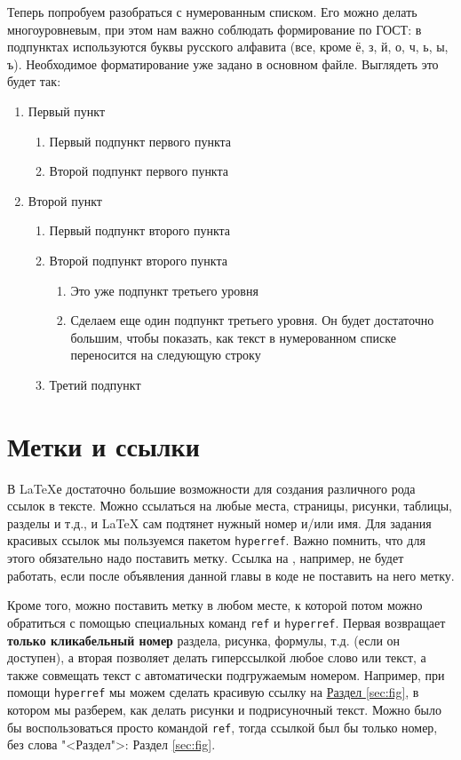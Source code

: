     Теперь попробуем разобраться с нумерованным списком. Его можно делать многоуровневым, при этом нам важно соблюдать формирование по ГОСТ: в подпунктах используются буквы русского алфавита (все, кроме ё, з, й, о, ч, ь, ы, ъ). Необходимое форматирование уже задано в основном файле. Выглядеть это будет так:

    \begin{enumerate}
        \item Первый пункт
        \begin{enumerate}
            \item Первый подпункт первого пункта
            \item Второй подпункт первого пункта
        \end{enumerate}
        \item Второй пункт
        \begin{enumerate}
            \item Первый подпункт второго пункта
            \item Второй подпункт второго пункта
            \begin{enumerate}
                \item Это уже подпункт третьего уровня
                \item Сделаем еще один подпункт третьего уровня. Он будет достаточно большим, чтобы показать, как текст в нумерованном списке переносится на следующую строку
            \end{enumerate}
            \item Третий подпункт
        \end{enumerate}
    \end{enumerate}

\section{Метки и ссылки}

В \LaTeX{}е достаточно большие возможности для создания различного рода ссылок в тексте. Можно ссылаться на любые места, страницы, рисунки, таблицы, разделы и т.д., и \LaTeX{} сам подтянет нужный номер и/или имя. Для задания красивых ссылок мы пользуемся пакетом \verb|hyperref|. Важно помнить, что для этого обязательно надо поставить метку. Ссылка на , например, не будет работать, если после объявления данной главы в коде не поставить на него метку. 

Кроме того, можно поставить метку в любом месте, к которой потом можно обратиться с помощью специальных команд \verb|ref| и \verb|hyperref|. Первая возвращает \textbf{только кликабельный номер} раздела, рисунка, формулы, т.д. (если он доступен), а вторая позволяет делать гиперссылкой любое слово или текст, а также совмещать текст с автоматически подгружаемым номером. Например,  при помощи \verb|hyperref| мы можем сделать красивую ссылку на \hyperref[sec:fig]{Раздел \ref{sec:fig}}, в котором мы разберем, как делать рисунки и подрисуночный текст. Можно было бы воспользоваться просто командой \verb|ref|, тогда ссылкой был бы только номер, без слова "<Раздел">: Раздел \ref{sec:fig}.

